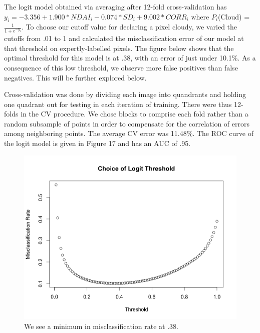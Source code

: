 \documentclass{article}\usepackage[]{graphicx}\usepackage[]{color}
\begin{document}
The logit model obtained via averaging after 12-fold cross-validation has $y_i = -3.356 + 1.900 * NDAI_i - 0.074 * SD_i + 9.002 * CORR_i$ where $P_i$(Cloud) = $ \frac{1}{1 + e^{-y_i}}$. To choose our cutoff value for declaring a pixel cloudy, we varied the cutoffs from .01 to 1 and calculated the misclassification error of our model at that threshold on expertly-labelled pixels. The figure below shows that the optimal threshold for this model is at .38, with an error of just under 10.1$\%$. As a consequence of this low threshold, we observe more false positives than false negatives. This will be further explored below.

Cross-validation was done by dividing each image into quandrants and holding one quadrant out for testing in each iteration of training. There were thus 12-folds in the CV procedure. We chose blocks to comprise each fold rather than a random subsample of points in order to compensate for the correlation of errors among neighboring points. The average CV error was 11.48$\%$. The ROC curve of the logit model is given in Figure 17 and has an AUC of .95.

\begin{figure}[H]
\begin{center}
\includegraphics[scale = .35]{threshold.png}
\caption{We see a minimum in misclassification rate at .38.}
\end{center}
\end{figure}
\end{document}
